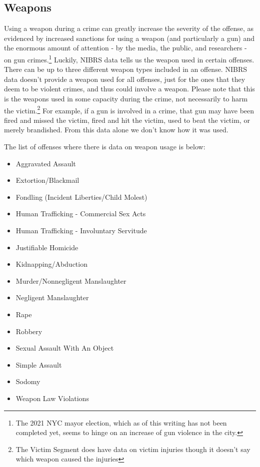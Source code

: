 \documentclass[
  12pt,
  openany]{book}
\providecommand{\tightlist}{%
  \setlength{\itemsep}{0pt}\setlength{\parskip}{0pt}}
\begin{document}
\hypertarget{offenseWeapons}{%
\subsection{Weapons}\label{offenseWeapons}}

Using a weapon during a crime can greatly increase the severity of the offense, as evidenced by increased sanctions for using a weapon (and particularly a gun) and the enormous amount of attention - by the media, the public, and researchers - on gun crimes.\footnote{The 2021 NYC mayor election, which as of this writing has not been completed yet, seems to hinge on an increase of gun violence in the city.} Luckily, NIBRS data tells us the weapon used in certain offenses. There can be up to three different weapon types included in an offense. NIBRS data doesn't provide a weapon used for all offenses, just for the ones that they deem to be violent crimes, and thus could involve a weapon. Please note that this is the weapons used in some capacity during the crime, not necessarily to harm the victim.\footnote{The Victim Segment does have data on victim injuries though it doesn't say which weapon caused the injuries} For example, if a gun is involved in a crime, that gun may have been fired and missed the victim, fired and hit the victim, used to beat the victim, or merely brandished. From this data alone we don't know how it was used.

The list of offenses where there is data on weapon usage is below:

\begin{itemize}
\tightlist
\item
  Aggravated Assault
\item
  Extortion/Blackmail
\item
  Fondling (Incident Liberties/Child Molest)
\item
  Human Trafficking - Commercial Sex Acts
\item
  Human Trafficking - Involuntary Servitude
\item
  Justifiable Homicide
\item
  Kidnapping/Abduction
\item
  Murder/Nonnegligent Manslaughter
\item
  Negligent Manslaughter
\item
  Rape
\item
  Robbery
\item
  Sexual Assault With An Object
\item
  Simple Assault
\item
  Sodomy
\item
  Weapon Law Violations
\end{itemize}
\end{document}
